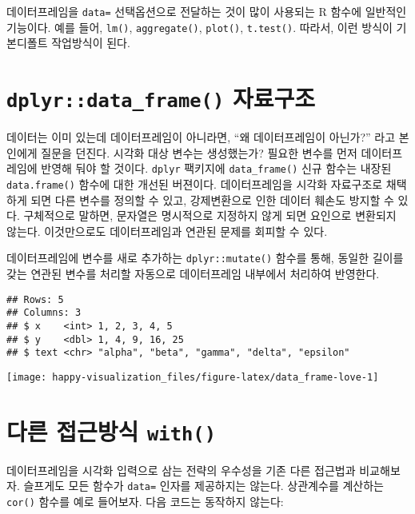 \documentclass[
]{book}
\begin{document}
데이터프레임을 \texttt{data=} 선택옵션으로 전달하는 것이 많이 사용되는 R 함수에 일반적인 기능이다.
예를 들어, \texttt{lm()}, \texttt{aggregate()}, \texttt{plot()}, \texttt{t.test()}.
따라서, 이런 방식이 기본디폴트 작업방식이 된다.

\hypertarget{viz-secret-explicit-dataframe}{%
\section{\texorpdfstring{\texttt{dplyr::data\_frame()} 자료구조}{dplyr::data\_frame() 자료구조}}\label{viz-secret-explicit-dataframe}}

데이터는 이미 있는데 데이터프레임이 아니라면,
``왜 데이터프레임이 아닌가?'' 라고 본인에게 질문을 던진다.
시각화 대상 변수는 생성했는가?
필요한 변수를 먼저 데이터프레임에 반영해 둬야 할 것이다.
\texttt{dplyr} 팩키지에 \texttt{data\_frame()} 신규 함수는 내장된 \texttt{data.frame()} 함수에 대한 개선된 버젼이다.
데이터프레임을 시각화 자료구조로 채택하게 되면
다른 변수를 정의할 수 있고, 강제변환으로 인한 데이터 훼손도 방지할 수 있다.
구체적으로 말하면, 문자열은 명시적으로 지정하지 않게 되면 요인으로 변환되지 않는다.
이것만으로도 데이터프레임과 연관된 문제를 회피할 수 있다.

데이터프레임에 변수를 새로 추가하는 \texttt{dplyr::mutate()} 함수를 통해, 동일한 길이를 갖는
연관된 변수를 처리할 자동으로 데이터프레임 내부에서 처리하여 반영한다.

\begin{verbatim}
## Rows: 5
## Columns: 3
## $ x    <int> 1, 2, 3, 4, 5
## $ y    <dbl> 1, 4, 9, 16, 25
## $ text <chr> "alpha", "beta", "gamma", "delta", "epsilon"
\end{verbatim}

\begin{center}\texttt{[image: happy-visualization\_files/figure-latex/data\_frame-love-1]} \end{center}

\hypertarget{viz-secret-with}{%
\section{\texorpdfstring{다른 접근방식 \texttt{with()}}{다른 접근방식 with()}}\label{viz-secret-with}}

데이터프레임을 시각화 입력으로 삼는 전략의 우수성을 기존 다른 접근법과 비교해보자.
슬프게도 모든 함수가 \texttt{data=} 인자를 제공하지는 않는다.
상관계수를 계산하는 \texttt{cor()} 함수를 예로 들어보자. 다음 코드는 동작하지 않는다:
\end{document}
